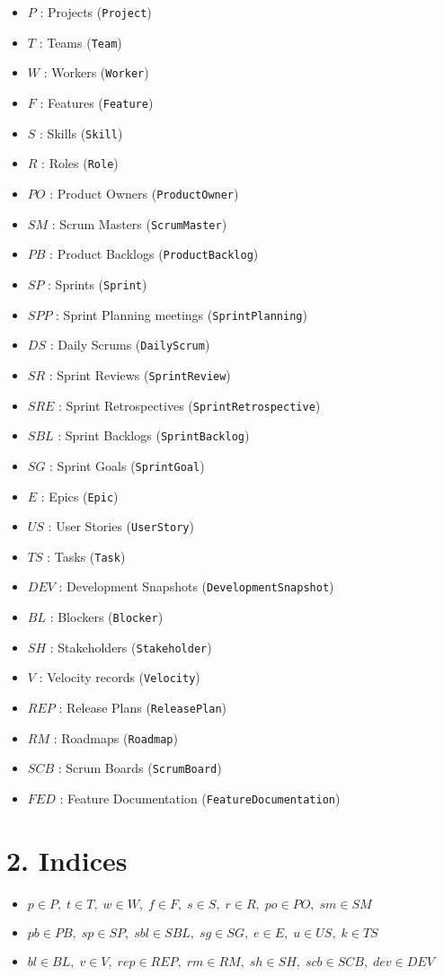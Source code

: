 \documentclass[11pt,a4paper]{article}
\begin{document}
\begin{itemize}
  \item $P$ : Projects (\texttt{Project})
  \item $T$ : Teams (\texttt{Team})
  \item $W$ : Workers (\texttt{Worker})
  \item $F$ : Features (\texttt{Feature})
  \item $S$ : Skills (\texttt{Skill})
  \item $R$ : Roles (\texttt{Role})
  \item $PO$ : Product Owners (\texttt{ProductOwner})
  \item $SM$ : Scrum Masters (\texttt{ScrumMaster})
  \item $PB$ : Product Backlogs (\texttt{ProductBacklog})
  \item $SP$ : Sprints (\texttt{Sprint})
  \item $SPP$ : Sprint Planning meetings (\texttt{SprintPlanning})
  \item $DS$ : Daily Scrums (\texttt{DailyScrum})
  \item $SR$ : Sprint Reviews (\texttt{SprintReview})
  \item $SRE$ : Sprint Retrospectives (\texttt{SprintRetrospective})
  \item $SBL$ : Sprint Backlogs (\texttt{SprintBacklog})
  \item $SG$ : Sprint Goals (\texttt{SprintGoal})
  \item $E$ : Epics (\texttt{Epic})
  \item $US$ : User Stories (\texttt{UserStory})
  \item $TS$ : Tasks (\texttt{Task})
  \item $DEV$ : Development Snapshots (\texttt{DevelopmentSnapshot})
  \item $BL$ : Blockers (\texttt{Blocker})
  \item $SH$ : Stakeholders (\texttt{Stakeholder})
  \item $V$ : Velocity records (\texttt{Velocity})
  \item $REP$ : Release Plans (\texttt{ReleasePlan})
  \item $RM$ : Roadmaps (\texttt{Roadmap})
  \item $SCB$ : Scrum Boards (\texttt{ScrumBoard})
  \item $FED$ : Feature Documentation (\texttt{FeatureDocumentation})
\end{itemize}

\section{2. Indices}
\begin{itemize}
  \item $p\in P,\; t\in T,\; w\in W,\; f\in F,\; s\in S,\; r\in R,\; po\in PO,\; sm\in SM$
  \item $pb\in PB,\; sp\in SP,\; sbl\in SBL,\; sg\in SG,\; e\in E,\; u\in US,\; k\in TS$
  \item $bl\in BL,\; v\in V,\; rep\in REP,\; rm\in RM,\; sh\in SH,\; scb\in SCB,\; dev\in DEV$
\end{itemize}
\end{document}
